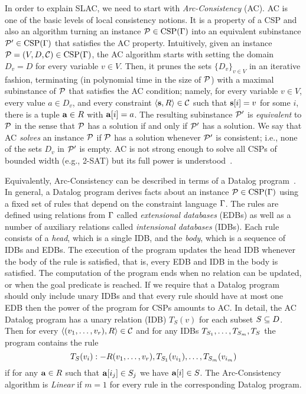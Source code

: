 In order to explain SLAC, we need to start with
\emph{Arc-Consistency} (AC). AC is one of the basic levels of local consistency
notions. It is a property of a CSP and also an algorithm
turning an instance ${\mathcal P}\in{\rm CSP}(\Gamma)$ into an equivalent subinstance
${\mathcal P}'\in{\rm CSP}(\Gamma)$ that satisfies the AC property. Intuitively, given an instance ${\mathcal P}=(V,D,{\mathcal C})\in{\rm CSP}(\Gamma)$,
the AC algorithm starts with setting the domain $D_v=D$ for every variable $v\in
V$. Then, it prunes the sets $\{D_v\}_{v\in V}$ in an iterative fashion,
terminating (in polynomial time in the size of ${\mathcal P}$) with a maximal subinstance
of ${\mathcal P}$ that satisfies the AC condition; namely, for every variable $v\in V$, every value $a\in
D_v$, and every constraint $\langle {\bf s},R \rangle\in{\mathcal C}$ such that ${\bf s}[i]=v$ for some $i$, there is a tuple ${\bf a}\in R$ with
${\bf a}[i]=a$. 
%
The resulting subinstance ${\mathcal P}'$ is \emph{equivalent} to ${\mathcal P}$
in the sense that ${\mathcal P}$ has a solution if and only if ${\mathcal P}'$ has a solution. We
say that AC \emph{solves} an instance ${\mathcal P}$ if ${\mathcal P}$ has a solution whenever
${\mathcal P}'$ is consistent; i.e., none of the sets $D_v$ in ${\mathcal P}'$ is empty.
%
AC is not strong enough to solve all CSPs of bounded width (e.g., \textsc{2-SAT}) but its
full power is understood~\cite{Feder98:monotone,Dalmau99}.

Equivalently, Arc-Consistency can be described in terms of a Datalog
program~\cite{Kolaitis95:jcss}. In general, a Datalog program derives facts about an
instance ${\mathcal P}\in{\rm CSP}(\Gamma)$
using a fixed set of rules that depend on the constraint language $\Gamma$. The
rules are defined using relations from $\Gamma$ called
\emph{extensional databases} (EDBs) as well as a number of auxiliary relations
called \emph{intensional databases} (IDBs). Each rule consists of a \emph{head},
which is a single IDB, and the \emph{body}, which is a sequence of IDBs and
EDBs. The execution of the program updates the head IDB whenever the body of the
rule is satisfied, that is, every EDB and IDB in the body is satisfied. The computation of the program ends when no relation can be
updated, or when the goal predicate is reached. If we require that a Datalog
program should only include unary IDBs and that every rule should have at most one EDB
then the power of the program for CSPs amounts to AC. 
%
In detail, the AC Datalog program has a unary relation (IDB) $T_S(v)$ for each 
subset $S\subseteq D$. Then for every $\langle (v _1,\ldots, v _{r}),R \rangle\in{\mathcal C}$ and for any
IDBs $T_{S_1},\ldots, T_{S_m}, T_S$ the program contains the rule
\[
T_S(v_i):-R(v _1,\ldots, v _{r}),T_{S_1}(v_{i_1}),\ldots, T_{S_m}(v_{i_m})
\]
if for any ${\bf a}\in R$ such that ${\bf a}[i_j]\in S_j$ we have ${\bf a}[i]\in S$.
%
The Arc-Consistency algorithm is \emph{Linear} if $m=1$ for every rule in the
corresponding Datalog program. 

